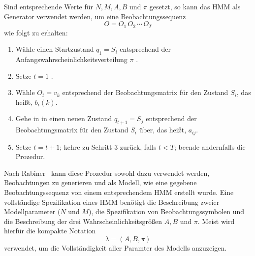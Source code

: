 Sind entsprechende Werte f\"ur $N, M, A, B$ und $\pi$ gesetzt, so kann das \acrshort{HMM} als Generator verwendet werden, um eine Beobachtungssequenz 
\begin{equation}
O = O_1 \, O_2 \, \cdots \, O_T
\end{equation}
wie folgt zu erhalten:
\begin{enumerate}
\item W\"ahle einen Startzustand $q_1 = S_i$ entsprechend der Anfangswahrscheinlichkeitsverteilung $\pi$ .
\item Setze $t = 1$ .
\item W\"ahle $O_t = v_k$ entsprechend der Beobachtungsmatrix f\"ur den Zustand $S_i$, das hei\ss t, $b_i(k)$.
\item Gehe in in einen neuen Zustand $q_{t+1} = S_j$ entsprechend der Beobachtungsmatrix f\"ur den Zustand $S_i$ \"uber, das hei\ss t, $a_{ij}$.
\item Setze $t = t+ 1$; kehre zu Schritt 3 zur\"uck, falls $t < T$; beende andernfalls die Prozedur.
\end{enumerate}
Nach Rabiner~\cite[S. 5]{bib:hmmrabiner} kann diese Prozedur sowohl dazu verwendet werden, Beobachtungen zu generieren und als Modell, wie eine gegebene Beobachtungssequenz von einem entsprechendem \acrshort{HMM} erstellt wurde.
\newline
Eine vollst\"andige Spezifikation eines \acrshort{HMM} ben\"otigt die Beschreibung zweier Modellparameter ($N$ und $M$), die Spezifikation von Beobachtungssymbolen und die Beschreibung der drei Wahrscheinlichkeitsgr\"o\ss en $A, B$ und $\pi$.
Meist wird hierf\"ur die kompakte Notation
\begin{equation}
\lambda = (A, B, \pi)
\end{equation}
verwendet, um die Vollst\"andigkeit aller Paramter des Modells anzuzeigen.

